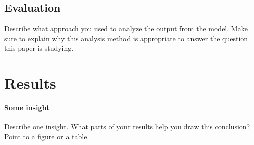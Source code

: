 \documentclass[11pt]{article}
\begin{document}
\subsection{Evaluation}
Describe what approach you used to analyze the output from the model. Make sure to explain why this analysis method is appropriate to answer the question this paper is studying.

\section{Results}

\paragraph{Some insight}
Describe one insight. What parts of your results help you draw this conclusion? Point to a figure or a table.
\end{document}
